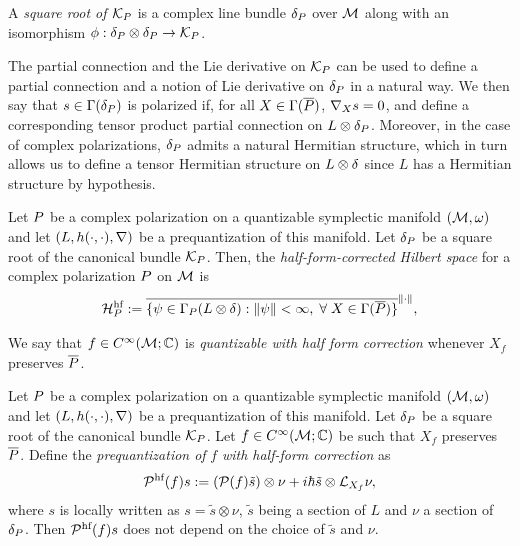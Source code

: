 \documentclass[notas.tex]{subfiles} 				%
\begin{document}
\begin{defn}
	A \emph{square root of $\mathcal{K}_P$} is a complex line bundle $\delta_P$ over $\mathcal{M}$ along with an isomorphism $\phi: \delta_P \otimes \delta_P \to \mathcal{K}_P$. 
\end{defn}

The partial connection and the Lie derivative on $\mathcal{K}_P$ can be used to define a partial connection and a notion of Lie derivative on $\delta_P$ in a natural way. We then say that $s \in \Gamma(\delta_P)$ is polarized if, for all $X \in \Gamma(\overline{P})$, $\nabla_{X} s = 0$, and define a corresponding tensor product partial connection on $L \otimes \delta_P$. Moreover, in the case of complex polarizations, $\delta_P$ admits a natural Hermitian structure, which in turn allows us to define a tensor Hermitian structure on $L \otimes \delta$ since $L$ has a Hermitian structure by hypothesis.
\begin{defn}
	Let $P$ be a complex polarization on a quantizable symplectic manifold $(\mathcal{M}, \omega)$ and let $(L, h(\cdot,\cdot), \nabla)$ be a prequantization of this manifold. Let $\delta_P$ be a square root of the canonical bundle $\mathcal{K}_P$.  Then, the \emph{half-form-corrected Hilbert space} for a complex polarization $P$ on $\mathcal{M}$ is
	\begin{align} \label{eq_reduced_hilb_whf}
		\hilb^\text{hf}_\pol := \close{\{\psi \in \sect_\pol(\lbund \otimes \sqrtb): \norm{\psi} < \infty, \; \forall X \in \Gamma(\overline{\pol})\}}^{\norm{\cdot}},
	\end{align}
\end{defn}

We say that $f \in C^\infty(\mathcal{M}; \mathbb{C})$ is \emph{quantizable with half form correction} whenever $X_f$ preserves $\overline {P}$.
\begin{prop}
	Let $P$ be a complex polarization on a quantizable symplectic manifold $(\mathcal{M}, \omega)$ and let $(L, h(\cdot,\cdot), \nabla)$ be a prequantization of this manifold. Let $\delta_P$ be a square root of the canonical bundle $\mathcal{K}_P$. Let $f \in C^\infty(\mathcal{M}; \mathbb{C})$ be such that $X_f$ preserves $\overline {P}$. Define the \emph{prequantization of} $f$ \emph{with half-form correction} as
	\begin{align} \label{eq_prq_whf}
		\mathcal{\mathcal{P}^\text{hf}}(f)  s := (\mathcal{P}(f)\tilde s)\otimes \nu + i \hbar \tilde s \otimes \mathcal{L}_{X_f}\nu,
	\end{align}
	where $s$ is locally written as $s = \tilde s \otimes \nu$, $\tilde s$ being a section of $L$ and $\nu$ a section of $\delta_P$. Then $\mathcal{\mathcal{P}^\text{hf}}(f) s$ does not depend on the choice of $\tilde s$ and $\nu$.
\end{prop}
\end{document}
